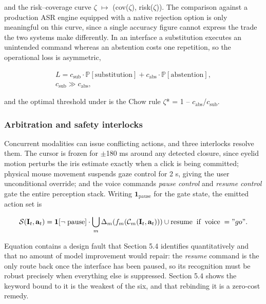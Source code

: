 and the risk--coverage curve $\zeta$ $\mapsto$ (cov($\zeta$), risk($\zeta$)). The comparison against a production ASR engine equipped with a native rejection option is only meaningful on this curve, since a single accuracy figure cannot express the trade the two systems make differently. In an interface a substitution executes an unintended command whereas an abstention costs one repetition, so the operational loss is asymmetric,

\begin{equation}
\label{eq:134}
\begin{aligned}
L = c_{\mathrm{sub}} \cdot \mathbb{P}[ \text{substitution} ] + c_{\mathrm{abs}} \cdot \mathbb{P}[ \text{abstention} ], \\
c_{\mathrm{sub}} \gg c_{\mathrm{abs}} ,
\end{aligned}
\end{equation}

and the optimal threshold under  is the Chow rule  $\zeta$* = 1 -- $c_{\mathrm{abs}}$/$c_{\mathrm{sub}}$.

\subsubsection{Arbitration and safety interlocks}

Concurrent modalities can issue conflicting actions, and three interlocks resolve them. The cursor is frozen for $\pm$180 ms around any detected closure, since eyelid motion perturbs the iris estimate exactly when a click is being committed; physical mouse movement suspends gaze control for 2 s, giving the user unconditional override; and the voice commands \emph{pause control} and \emph{resume control} gate the entire perception stack. Writing $\mathbf{1}_{\mathrm{pause}}$ for the gate state, the emitted action set is

\begin{equation}
\label{eq:135}
\mathcal{S}(\mathbf{I}_{t}, \mathbf{a}_{t}) = \mathbf{1}[ \neg \;\text{pause} ] \cdot \bigcup _{m} \Delta _m( f_m( \mathcal{C}_m(\mathbf{I}_{t}, \mathbf{a}_{t}) ) ) \cup { \text{resume}\; \;\text{if}\; \;\text{voice}\; = "go" } .
\end{equation}

Equation  contains a design fault that Section 5.4 identifies quantitatively and that no amount of model improvement would repair: the \emph{resume} command is the only route back once the interface has been paused, so its recognition must be robust precisely when everything else is suppressed. Section 5.4 shows the keyword bound to it is the weakest of the six, and that rebinding it is a zero-cost remedy.

